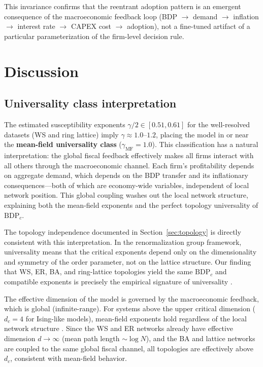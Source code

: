 \documentclass[12pt,a4paper]{article}
\begin{document}
This invariance confirms that the reentrant adoption pattern is an emergent
consequence of the macroeconomic feedback loop
(BDP $\to$ demand $\to$ inflation $\to$ interest rate $\to$ CAPEX cost $\to$
adoption), not a fine-tuned artifact of a particular parameterization of the
firm-level decision rule.

\section{Discussion}
\label{sec:discussion}

\subsection{Universality class interpretation}
\label{sec:universality}

The estimated susceptibility exponents $\gamma/2 \in [0.51, 0.61]$ for the
well-resolved datasets (WS and ring lattice) imply $\gamma \approx 1.0$--$1.2$,
placing the model in or near the \textbf{mean-field universality class}
($\gamma_{\mathrm{MF}} = 1.0$). This classification has a natural
interpretation: the global fiscal feedback effectively makes all firms interact
with all others through the macroeconomic channel. Each firm's profitability
depends on aggregate demand, which depends on the BDP transfer and its
inflationary consequences---both of which are economy-wide variables,
independent of local network position. This global coupling washes out the
local network structure, explaining both the mean-field exponents and the
perfect topology universality of $\mathrm{BDP}_c$.

The topology independence documented in Section~\ref{sec:topology} is
directly consistent with this interpretation. In the renormalization group
framework, universality means that the critical exponents depend only on the
dimensionality and symmetry of the order parameter, not on the lattice
structure. Our finding that WS, ER, BA, and ring-lattice topologies yield the
same $\mathrm{BDP}_c$ and compatible exponents is precisely the empirical
signature of universality \parencite{Stanley1971,Fisher1998}.

The effective dimension of the model is governed by the macroeconomic feedback,
which is global (infinite-range). For systems above the upper critical
dimension ($d_c = 4$ for Ising-like models), mean-field exponents hold
regardless of the local network structure
\parencite{Castellano2009,Binder2010}. Since the WS and ER networks already
have effective dimension $d \to \infty$ (mean path length $\sim \log N$), and
the BA and lattice networks are coupled to the same global fiscal channel, all
topologies are effectively above~$d_c$, consistent with mean-field behavior.
\end{document}
